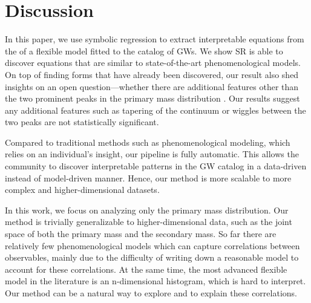 \documentclass[nohyperref]{article}
\theoremstyle{plain}
\theoremstyle{definition}
\theoremstyle{remark}
\begin{document}
\section{Discussion}
\label{sec:discussion}

In this paper, we use symbolic regression to extract interpretable equations from the \ppd of a flexible model fitted to the catalog of GWs.
We show SR is able to discover equations that are similar to state-of-the-art phenomenological models.
On top of finding forms that have already been discovered,
our result also shed insights on an open question---whether there are additional features other than the two prominent peaks in the primary mass distribution \cite{Tiwari:2021yvr}.
Our results suggest any additional features such as tapering of the continuum or wiggles between the two peaks are not statistically significant.

Compared to traditional methods such as phenomenological modeling, which relies on an individual's insight,
our pipeline is fully automatic.
This allows the community to discover interpretable patterns in the GW catalog in a data-driven instead of model-driven manner.
Hence, our method is more scalable to more complex and higher-dimensional datasets.

In this work, we focus on analyzing only the primary mass distribution.
Our method is trivially generalizable to higher-dimensional data, such as the joint space of both the primary mass and the secondary mass.
So far there are relatively few phenomenological models which can capture correlations between observables,
mainly due to the difficulty of writing down a reasonable model to account for these correlations.
At the same time, the most advanced flexible model in the literature is an n-dimensional histogram, which is hard to interpret.
Our method can be a natural way to explore and to explain these correlations.

% 

\end{document}
